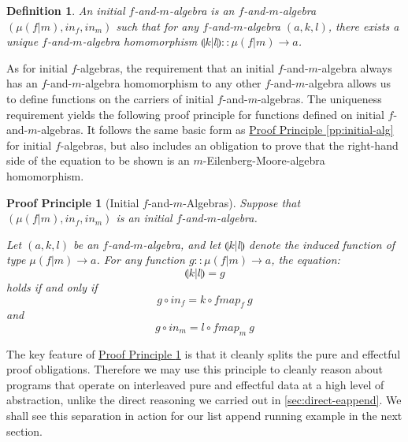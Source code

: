 \documentclass{jfp1}
\newcommand{\eFold}[2]{\llparenthesis #1|#2 \rrparenthesis}
\newtheorem{definition}{Definition}
\newtheorem{proofprinciple}{Proof Principle}
\newcommand{\proofprinref}[1]{\hyperref[#1]{Proof Principle \ref*{#1}}}
\begin{document}
\begin{definition}\label{def:f-and-m-folds}
  An \emph{initial $f$-and-$m$-algebra} is an $f$-and-$m$-algebra
  $(\mu(f|m), \mathit{in}_f, \mathit{in}_m)$ such that for any
  $f$-and-$m$-algebra $(a, k, l)$, there exists a unique
  $f$-and-$m$-algebra homomorphism $\eFold{k}{l} :: \mu(f|m) \to
  a$.
\end{definition}

As for initial $f$-algebras, the requirement that an initial
$f$-and-$m$-algebra always has an $f$-and-$m$-algebra homomorphism to
any other $f$-and-$m$-algebra allows us to define functions on the
carriers of initial $f$-and-$m$-algebras. The uniqueness requirement
yields the following proof principle for functions defined on initial
$f$-and-$m$-algebras. It follows the same basic form as
\proofprinref{pp:initial-alg} for initial $f$-algebras, but also
includes an obligation to prove that the right-hand side of the
equation to be shown is an $m$-Eilenberg-Moore-algebra
homomorphism.

\begin{proofprinciple}[Initial $f$-and-$m$-Algebras]
  \label{pp:initial-f-m-alg}
  Suppose that $(\mu(f|m), \mathit{in}_f, \mathit{in}_m)$ is an
  initial $f$-and-$m$-algebra. 

  Let $(a, k, l)$ be an $f$-and-$m$-algebra, and let $\eFold{k}{l}$
  denote the induced function of type $\mu(f|m) \to a$. For any
  function $g :: \mu(f|m) \to a$, the equation:
  \begin{displaymath}
    \eFold{k}{l} = g
  \end{displaymath}
  holds if and only if
  \begin{equation}\label{eq:fm-falg}
    g \circ \mathit{in}_f = k \circ \mathit{fmap}_f~g
  \end{equation}
  and
  \begin{equation}\label{eq:fm-malg}
    g \circ \mathit{in}_m = l \circ \mathit{fmap}_m~g
  \end{equation}
\end{proofprinciple}

The key feature of \proofprinref{pp:initial-f-m-alg} is that it
cleanly splits the pure and effectful proof obligations. Therefore we
may use this principle to cleanly reason about programs that operate
on interleaved pure and effectful data at a high level of abstraction,
unlike the direct reasoning we carried out in
\autoref{sec:direct-eappend}. We shall see this separation in action
for our list append running example in the next section.
\end{document}
